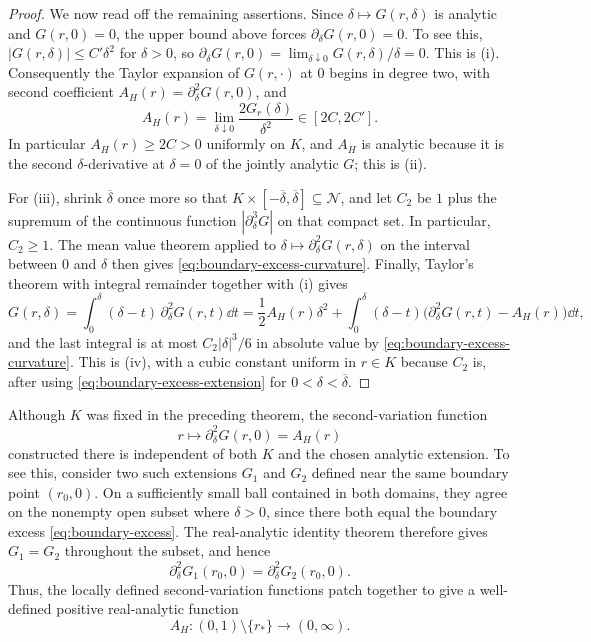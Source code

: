 \begin{proof}
We now read off the remaining assertions.  Since
$\delta\mapsto G(r,\delta)$ is analytic and $G(r,0)=0$, the upper bound
above forces
$\partial_\delta G(r,0)=0$.  To see this,
$|G(r,\delta)|\le C'\delta^2$ for $\delta>0$, so
$\partial_\delta G(r,0)=\lim_{\delta\downarrow0}G(r,\delta)/\delta=0$.  This
is (i).  Consequently the Taylor expansion of $G(r,\cdot)$ at $0$ begins in
degree two, with second coefficient $A_H(r)=\partial_\delta^2G(r,0)$, and
\[
  A_H(r)=\lim_{\delta\downarrow0}\frac{2G_r(\delta)}{\delta^2}\in[2C,2C'].
\]
In particular $A_H(r)\ge2C>0$ uniformly on $K$, and $A_H$ is analytic because
it is the second $\delta$-derivative at $\delta=0$ of the jointly analytic
$G$; this is (ii).

For (iii), shrink $\overline\delta$ once more so that
$K\times[-\overline\delta,\overline\delta]\subseteq\mathcal N$, and let $C_2$ be
$1$ plus the supremum of the continuous function $|\partial_\delta^3G|$ on
that compact set.  In particular, $C_2\ge1$.  The mean value theorem applied to
$\delta\mapsto\partial_\delta^2G(r,\delta)$ on the interval between $0$ and
$\delta$ then gives \eqref{eq:boundary-excess-curvature}.  Finally, Taylor's theorem
with integral remainder together with (i) gives
\[
  G(r,\delta)
  =\int_0^\delta(\delta-t)\,\partial_\delta^2G(r,t)\dd t
  =\frac12A_H(r)\delta^2
   +\int_0^\delta(\delta-t)\bigl(\partial_\delta^2G(r,t)-A_H(r)\bigr)\dd t,
\]
and the last integral is at most $C_2|\delta|^3/6$ in absolute value by
\eqref{eq:boundary-excess-curvature}.  This is (iv), with a cubic constant uniform in
$r\in K$ because $C_2$ is, after using \eqref{eq:boundary-excess-extension} for
$0<\delta<\overline\delta$.
\end{proof}

Although $K$ was fixed in the preceding theorem, the second-variation
function
\[
  r\longmapsto \partial_\delta^2G(r,0)=A_H(r)
\]
constructed there is independent of both $K$ and the chosen analytic
extension.  To see this, consider two such extensions $G_1$ and $G_2$ defined
near the same boundary point $(r_0,0)$.  On a sufficiently small ball contained in
both domains, they agree on the nonempty open subset where $\delta>0$, since
there both equal the boundary excess \eqref{eq:boundary-excess}.  The real-analytic
identity theorem therefore gives $G_1=G_2$ throughout the subset, and hence
\[
  \partial_\delta^2G_1(r_0,0)
  =
  \partial_\delta^2G_2(r_0,0).
\]
Thus, the locally defined second-variation functions patch together to give a
well-defined positive real-analytic function
\begin{equation}\label{eq:second-variation-domain}
  A_H:(0,1)\setminus\{r_*\}\longrightarrow(0,\infty).
\end{equation}